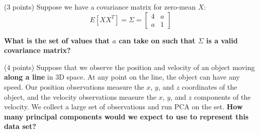 \begin{Parts}

\Part (3 points) Suppose we have a covariance matrix for zero-mean $X$:
\[
E[X X^T] = \Sigma = \begin{bmatrix} 4 & a\\a & 1\end{bmatrix}
\]

\textbf{What is the set of values that $a$ can take on such that $\Sigma$ is a valid covariance matrix?}



\ifexamnosol
\vspace{3in}
\fi

\Part (4 points) Suppose that we observe the position and velocity of an object moving \textbf{along a line} in 3D space.  At any point on the line, the object can have any speed. Our position observations measure the $x$, $y$, and $z$ coordinates of the object, and the velocity observations measure the $x$, $y$, and $z$ components of the velocity. We collect a large set of observations and run PCA on the set. \textbf{How many principal components would we expect to use to represent this data set?}



\ifexamnosol
\vspace{2in}
\fi

\end{Parts}


